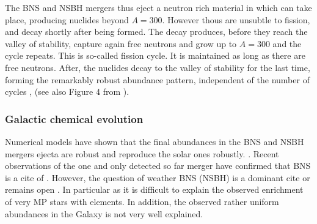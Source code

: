 The \ac{BNS} and \ac{NSBH} mergers thus eject a neutron rich material in which \rproc{} can take place, producing nuclides beyond $A=300$. However thous are unsubtle to fission, and decay shortly after being formed. The decay produces, before they reach the valley of stability, capture again free neutrons and grow up to $A=300$ and the cycle repeats. This is so-called 
fission cycle. 
It is maintained as long as there are free neutrons. After, the nuclides decay to the valley of stability for the last time, forming the remarkably robust abundance pattern, independent of the number of cycles \citep{Korobkin:2012uy,Bauswein:2013,Mendoza-Temis:2014mja}, (see also Figure 4 from \citet{Korobkin:2012uy}).


\subsubsection{Galactic chemical evolution}

Numerical models have shown that the final \rproc{} abundances in the \ac{BNS} and \ac{NSBH} mergers ejecta are robust and reproduce the solar ones robustly. \citep{Freiburghaus:1999,Goriely:2011vg,Goriely:2015fqa,Wanajo:2014wha,Just:2014fka,Radice:2016dwd}\red{[Refs]}. Recent observations of the one and only detected so far merger have confirmed that \ac{BNS} is a cite of \rproc{} \red{[Refs]}.
However, the question of weather \ac{BNS} (\ac{NSBH}) is a dominant cite or \rproc{} \nuc{} remains open \citep{Qian:2000bh,Argast:2003he,Matteucci:2014}. 
In particular as it is difficult to explain the observed enrichment of very \ac{MP} stars with \rproc{} elements. In addition, the observed rather uniform \rproc{} abundances in the Galaxy is not very well explained.


